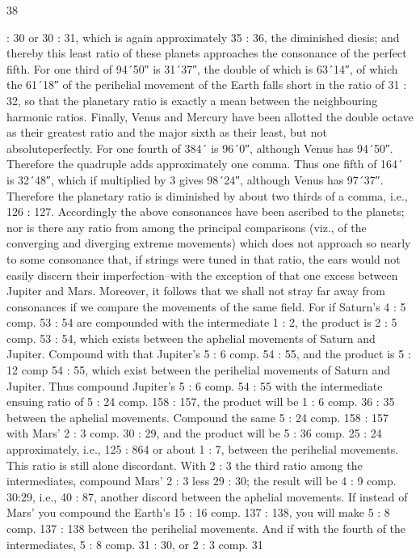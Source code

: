 \documentclass{article}
\begin{document}
38

: 30 or 30 : 31, which is again approximately 35 : 36, the diminished
diesis; and thereby this least ratio of these planets approaches the
consonance of the perfect fifth. For one third of 94´50″ is 31´37″, the
double of which is 63´14″, of which the 61´18″ of the perihelial
movement of the Earth falls short in the ratio of 31 : 32, so that the
planetary ratio is exactly a mean between the neighbouring harmonic
ratios. Finally, Venus and Mercury have been allotted the double octave
as their greatest ratio and the major sixth as their least, but not absoluteperfectly. For one fourth of 384´ is 96´0″, although Venus has 94´50″.
Therefore the quadruple adds approximately one comma. Thus one fifth
of 164´ is 32´48″, which if multiplied by 3 gives 98´24″, although Venus
has 97´37″. Therefore the planetary ratio is diminished by
about two thirds of a comma, i.e., 126 : 127.
Accordingly the above consonances have been ascribed to the planets;
nor is there any ratio from among the principal comparisons (viz., of the
converging and diverging extreme movements) which does not approach
so nearly to some consonance that, if strings were tuned in that ratio, the
ears would not easily discern their imperfection--with the exception of
that one excess between Jupiter and Mars.
Moreover, it follows that we shall not stray far away from consonances if
we compare the movements of the same field. For if Saturn's 4 : 5 comp.
53 : 54 are compounded with the intermediate 1 : 2, the product is 2 : 5
comp. 53 : 54, which exists between the aphelial movements of Saturn
and Jupiter. Compound with that Jupiter's 5 : 6 comp. 54 : 55, and the
product is 5 : 12 comp 54 : 55, which exist between the perihelial
movements of Saturn and Jupiter. Thus compound Jupiter's 5 : 6 comp.
54 : 55 with the intermediate ensuing ratio of 5 : 24 comp. 158 : 157, the
product will be 1 : 6 comp. 36 : 35 between the aphelial movements.
Compound the same 5 : 24 comp. 158 : 157 with Mars’ 2 : 3 comp. 30 :
29, and the product will be 5 : 36 comp. 25 : 24 approximately, i.e., 125 :
864 or about 1 : 7, between the perihelial movements. This ratio is still
alone discordant. With 2 : 3 the third ratio among the intermediates,
compound Mars’ 2 : 3 less 29 : 30; the result will be 4 : 9 comp.
30:29, i.e., 40 : 87, another discord between the aphelial movements. If
instead of Mars’ you compound the Earth's 15 : 16 comp. 137 : 138, you
will make 5 : 8 comp. 137 : 138 between the perihelial movements. And if
with the fourth of the intermediates, 5 : 8 comp. 31 : 30, or 2 : 3 comp. 31
\end{document}
